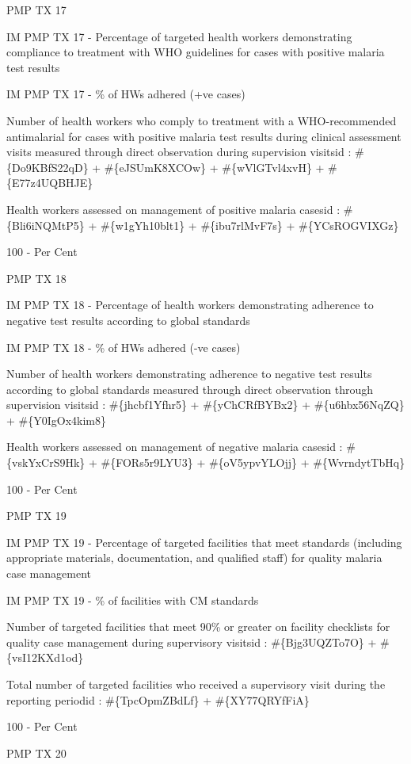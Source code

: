 \documentclass[]{book}
\begin{document}
PMP TX 17

IM PMP TX 17 - Percentage of targeted health workers demonstrating compliance to treatment with WHO guidelines for cases with positive malaria test results

IM PMP TX 17 - \% of HWs adhered (+ve cases)

Number of health workers who comply to treatment with a WHO-recommended antimalarial for cases with positive malaria test results during clinical assessment visits measured through direct observation during supervision visitsid : \#\{Do9KBfS22qD\} + \#\{eJSUmK8XCOw\} + \#\{wVlGTvl4xvH\} + \#\{E77z4UQBHJE\}

Health workers assessed on management of positive malaria casesid : \#\{Bli6iNQMtP5\} + \#\{w1gYh10blt1\} + \#\{ibu7rlMvF7s\} + \#\{YCsROGVIXGz\}

100 - Per Cent

PMP TX 18

IM PMP TX 18 - Percentage of health workers demonstrating adherence to negative test results according to global standards

IM PMP TX 18 - \% of HWs adhered (-ve cases)

Number of health workers demonstrating adherence to negative test results according to global standards measured through direct observation through supervision visitsid : \#\{jhcbf1Yfhr5\} + \#\{yChCRfBYBx2\} + \#\{u6hbx56NqZQ\} + \#\{Y0IgOx4kim8\}

Health workers assessed on management of negative malaria casesid : \#\{vskYxCrS9Hk\} + \#\{FORs5r9LYU3\} + \#\{oV5ypvYLOjj\} + \#\{WvrndytTbHq\}

100 - Per Cent

PMP TX 19

IM PMP TX 19 - Percentage of targeted facilities that meet standards (including appropriate materials, documentation, and qualified staff) for quality malaria case management

IM PMP TX 19 - \% of facilities with CM standards

Number of targeted facilities that meet 90\% or greater on facility checklists for quality case management during supervisory visitsid : \#\{Bjg3UQZTo7O\} + \#\{vsI12KXd1od\}

Total number of targeted facilities who received a supervisory visit during the reporting periodid : \#\{TpcOpmZBdLf\} + \#\{XY77QRYfFiA\}

100 - Per Cent

PMP TX 20
\end{document}
